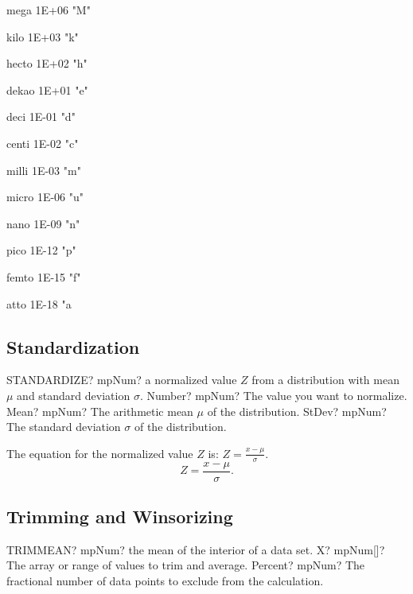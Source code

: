 mega 1E+06 "M" 

kilo 1E+03 "k" 

hecto 1E+02 "h" 

dekao 1E+01 "e" 

deci 1E-01 "d" 

centi 1E-02 "c" 

milli 1E-03 "m" 

micro 1E-06 "u" 

nano 1E-09 "n" 

pico 1E-12 "p" 

femto 1E-15 "f" 

atto 1E-18 "a 







\subsection{Standardization}

\begin{mpFunctionsExtract}
	\mpWorksheetFunctionThreeNotImplemented
	{STANDARDIZE? mpNum? a normalized value  $Z$ from a distribution with mean $\mu$ and standard deviation $\sigma$.}
	{Number? mpNum? The value you want to normalize.}
	{Mean? mpNum? The arithmetic mean $\mu$ of the distribution.}
	{StDev? mpNum? The standard deviation  $\sigma$ of the distribution.}
\end{mpFunctionsExtract}

\vspace{0.3cm}
The equation for the normalized value $Z$ is: $Z=\frac{x-\mu}{\sigma}$.
\begin{equation}
Z=\frac{x-\mu}{\sigma}.
\end{equation}




\subsection{Trimming and Winsorizing}

\begin{mpFunctionsExtract}
	\mpWorksheetFunctionTwoNotImplemented
	{TRIMMEAN? mpNum? the mean of the interior of a data set.}
	{X? mpNum[]? The array or range of values to trim and average.}
	{Percent? mpNum? The fractional number of data points to exclude from the calculation.}
\end{mpFunctionsExtract}



